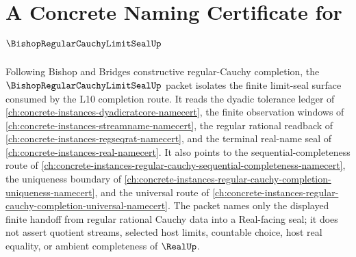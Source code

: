 \chapter{A Concrete Naming Certificate for $\BishopRegularCauchyLimitSealUp$}
\label{ch:concrete-instances-bishop-regular-cauchy-limit-seal-namecert}

Following Bishop and Bridges constructive regular-Cauchy completion, the $\BishopRegularCauchyLimitSealUp$ packet isolates the finite limit-seal surface consumed by the L10 completion route. It reads the dyadic tolerance ledger of \autoref{ch:concrete-instances-dyadicratcore-namecert}, the finite observation windows of \autoref{ch:concrete-instances-streamname-namecert}, the regular rational readback of \autoref{ch:concrete-instances-regseqrat-namecert}, and the terminal real-name seal of \autoref{ch:concrete-instances-real-namecert}. It also points to the sequential-completeness route of \autoref{ch:concrete-instances-regular-cauchy-sequential-completeness-namecert}, the uniqueness boundary of \autoref{ch:concrete-instances-regular-cauchy-completion-uniqueness-namecert}, and the universal route of \autoref{ch:concrete-instances-regular-cauchy-completion-universal-namecert}. The packet names only the displayed finite handoff from regular rational Cauchy data into a Real-facing seal; it does not assert quotient streams, selected host limits, countable choice, host real equality, or ambient completeness of $\RealUp$.

